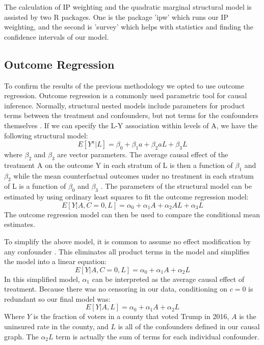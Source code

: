 \documentclass[11pt, conference,compsoc]{IEEEtran}
\begin{document}
The calculation of IP weighting and the quadratic marginal structural model is assisted by two R packages. One is the package 'ipw' which runs our IP weighting, and the second is 'survey' which helps with statistics and finding the confidence intervals of our model.
\subsection{Outcome Regression}
To confirm the results of the previous methodology we opted to use outcome regression. Outcome regression is a commonly used parametric tool for causal inference. Normally, structural nested models include parameters for product terms between the treatment and confounders, but not terms for the confounders themselves \cite{hernan}. If we can specify the L-Y association within levels of A, we have the following structural model:
\begin{equation}
E[Y^{a}|L]=\beta_0+\beta_1a+\beta_2aL+\beta_3L
\end{equation}
where $\beta_2$ and $\beta_3$ are vector parameters. The average causal effect of the treatment A on the outcome Y in each stratum of L is then a function of $\beta_1$ and $\beta_2$ while the mean counterfactual outcomes under no treatment in each stratum of L is a function of $\beta_0$ and $\beta_3$ \cite{hernan}. The parameters of the structural model can be estimated by using ordinary least squares to fit the outcome regression model:
\begin{equation}
E[Y|A, C=0, L]=\alpha_0+\alpha_1A+\alpha_2AL+\alpha_3L
\end{equation}
The outcome regression model can then be used to compare the conditional mean estimates.

To simplify the above model, it is common to assume no effect modification by any confounder \cite{hernan}. This eliminates all product terms in the model and simplifies the model into a linear equation:
\begin{equation}
E[Y|A, C=0, L]=\alpha_0+\alpha_1A+\alpha_2L
\end{equation}
In this simplified model, $\alpha_1$ can be interpreted as the average causal effect of treatment. Because there was no censoring in our data, conditioning on $c=0$ is redundant so our final model was:
\begin{equation}
\label{outcome_regression_model}
E[Y|A, L]=\alpha_0+\alpha_1A+\alpha_2L
\end{equation}
Where $Y$ is the fraction of voters in a county that voted Trump in 2016, $A$ is the uninsured rate in the county, and $L$ is all of the confounders defined in our causal graph. The $\alpha_2L$ term is actually the sum of terms for each individual confounder.
\end{document}
